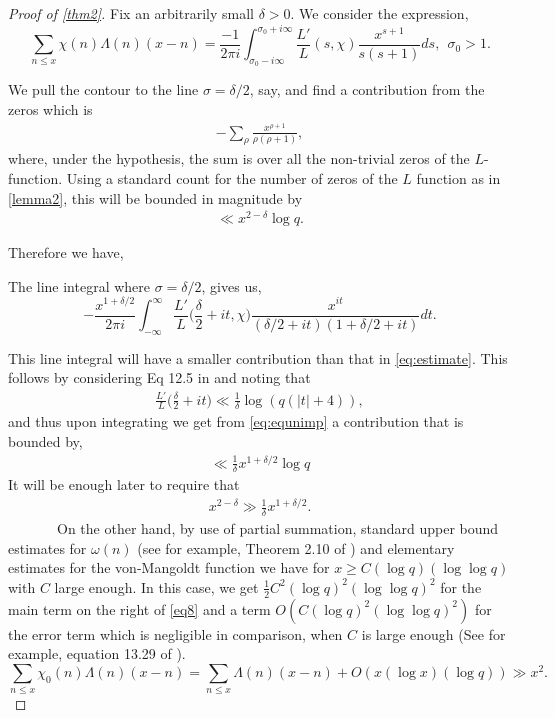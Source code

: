 \documentclass[letter,12pt]{article}
\newcounter{lem}
\theoremstyle{plain}
\theoremstyle{definition}
\theoremstyle{plain}
\begin{document}
\begin{proof}[Proof of \cref{thm2}]

Fix an arbitrarily small $\delta>0$. We consider the expression, 
\begin{equation}\label{eq;eq2}
    \sum_{n\leq x} \chi(n)\Lambda(n)(x-n)=\frac{-1}{2\pi i}\int_{\sigma_0 -i\infty}^{\sigma_0 +i\infty} \frac{L'}{L}(s,\chi)\frac{x^{s+1}}{s(s+1)}ds, \ \ \sigma_{0}>1.
\end{equation}

\noindent We pull the contour to the line $\sigma=\delta/2$, say, and find a contribution from the zeros which is 
    \begin{align}\label{eq:estimate}
        -\sum\limits_{\rho}\frac{x^{\rho+1}}{\rho(\rho+1)},
    \end{align}
where, under the hypothesis, the sum is over all the non-trivial zeros of the $L$-function. Using a standard count for the number of zeros of the $L$ function as in \cref{lemma2}, this will be bounded in magnitude by 
\begin{align}\label{eqimp2}
\ll x^{2-\delta}\log q. 
\end{align}

Therefore we have, 

The line integral where $\sigma=\delta/2$, gives us,
\begin{equation}\label{eq:equnimp}
 -\frac{x^{1+ \delta/2}}{2\pi i}\int_{-\infty}^{\infty} \frac{L'}{L}\Big(\frac{\delta}{2} +it,\chi\Big) \frac{x^{it}}{(\delta/2 +it)(1+\delta/2 +it)}dt.
\end{equation}

\noindent This line integral will have a smaller contribution than that in \cref{eq:estimate}. This follows by considering Eq 12.5 in \cite{Mont} and noting that
\begin{align}
    \frac{L'}{L}\Big(\frac{\delta}{2} +it \Big)\ll \frac{1}{\delta}\log(q(|t|+4)),
\end{align}
and thus upon integrating we get from \cref{eq:equnimp}  a contribution that is bounded by,
\begin{align}\label{eqimp}
\ll \frac{1}{\delta}x^{1+\delta/2}\log q \end{align}
It will be enough later to require that 
\begin{align}\label{eq:eq12}
x^{2-\delta}\gg \frac{1}{\delta}x^{1+\delta/2}.
\end{align}
 \ \ \  \ \ \ \       On the other hand, by use of partial summation, standard upper bound estimates for $\omega(n)$ (see for example, Theorem 2.10 of \cite{Mont}) and elementary estimates for the von-Mangoldt function we have for $x\geq C(\log q)(\log \log q)$ with $C$ large enough. In this case, we get $\frac{1}{2}C^{2}(\log q)^2 (\log \log q)^2$ for the main term on the right of \cref{eq8} and a term $O(C (\log q)^2 (\log \log q)^2)$ for the error term which is negligible in comparison, when $C$ is large enough (See for example, equation 13.29 of \cite{Mont}).
\begin{equation}\label{eq8}
    \sum_{n\leq x} \chi_0 (n)\Lambda(n)(x-n)=\sum_{n\leq x} \Lambda(n)(x-n)+O(x(\log x)(\log q))\gg x^{2}.
\end{equation}


\end{proof}
\end{document}
